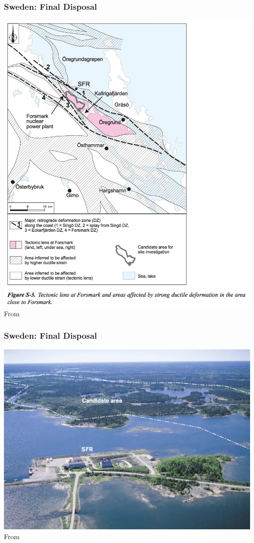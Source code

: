 \begin{frame}[c]
\frametitle{Sweden: Final Disposal}

\includegraphics[width=\textwidth]{./images/sweden-forsmark-map}
From \cite{skb_long-term_2011}

\end{frame}
\begin{frame}[c]
\frametitle{Sweden: Final Disposal}
\includegraphics[width=\textwidth]{./images/sweden-forsmark-candidate}
From \cite{skb_long-term_2011}
\end{frame}


